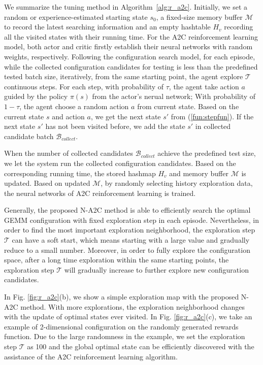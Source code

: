 We summarize the tuning method in Algorithm~\ref{alg:r_a2c}. Initially, we set a random or experience-estimated starting state $s_0$, a fixed-size memory buffer $\mathcal{M}$ to record the latest searching information and an empty hashtable $H_v$ recording all the visited states with their running time. For the A2C reinforcement learning model, both actor and critic firstly establish their neural networks with random weights, respectively. Following the configuration search model, for each episode, while the collected configuration candidates for testing is less than the predefined tested batch size, iteratively, from the same starting point, the agent explore $\mathcal{T}$ continuous steps. For each step, with probability of $\tau$, the agent take action $a$ guided by the policy $\pi(s)$ from the actor's nerual network; With probability of $1-\tau$, the agent choose a random action $a$ from current state. Based on the current state $s$ and action $a$, we get the next state $s'$ from (\ref{fun:stepfun}). If the next state $s'$ has not been visited before, we add the state $s'$ in collected candidate batch $\mathcal{B}_{collect}$.




When the number of collected candidates $\mathcal{B}_{collect}$ achieve the predefined test size, we let the system run the collected configuration candidates. Based on the corresponding running time, the stored hashmap $H_v$ and memory buffer $\mathcal{M}$ is updated. Based on updated $\mathcal{M}$, by randomly selecting history exploration data, the neural networks of A2C reinforcement learning is trained.



Generally, the proposed N-A2C method is able to efficiently search the optimal GEMM configuration with fixed exploration step in each episode. Nevertheless, in order to find the most important exploration neighborhood, the exploration step $\mathcal{T}$ can have a soft start, which means starting with a large value and gradually reduce to a small number. Moreover, in order to fully explore the configuration space, after a long time exploration within the same starting points, the exploration step $\mathcal{T}$ will gradually increase to further explore new configuration candidates.

In Fig. \ref{fig:r_a2c}(b), we show a simple exploration map with the proposed N-A2C method. With more explorations, the exploration neighborhood changes with the update of optimal states ever visited. In Fig. \ref{fig:r_a2c}(c), we take an example of 2-dimensional configuration on the randomly generated rewards function. Due to the large randomness in the example, we set the exploration step $\mathcal{T}$ as 100 and the global optimal state can be efficiently discovered with the assistance of the A2C reinforcement learning algorithm.

